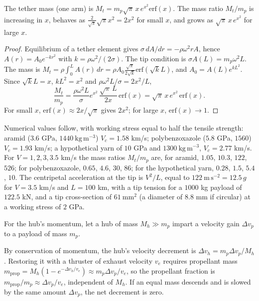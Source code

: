 \begin{proposition}
The tether mass (one arm) is $M_t=m_p\sqrt\pi\,x\,e^{x^2}\mathrm{erf}(x)$. The mass ratio $M_t/m_p$ is increasing in $x$, behaves as $\tfrac{2}{\sqrt{\pi}}\sqrt\pi x^2=2x^2$ for small $x$, and grows as $\sqrt\pi\,x\,e^{x^2}$ for large $x$.
\end{proposition}

\begin{proof}
Equilibrium of a tether element gives $\sigma\,dA/dr=-\rho\omega^2rA$, hence $A(r)=A_0e^{-kr^2}$ with $k=\rho\omega^2/(2\sigma)$. The tip condition is $\sigma A(L)=m_p\omega^2L$. The mass is $M_t=\rho\int_0^LA(r)\,dr=\rho A_0\frac{\sqrt\pi}{2\sqrt k}\mathrm{erf}(\sqrt kL)$, and $A_0=A(L)e^{kL^2}$. Since $\sqrt kL=x$, $kL^2=x^2$ and $\rho\omega^2L/\sigma=2x^2/L$,
\[
\frac{M_t}{m_p}=\frac{\rho\omega^2L}{\sigma}e^{x^2}\,\frac{\sqrt\pi\,L}{2x}\,\mathrm{erf}(x)=\sqrt\pi\,x\,e^{x^2}\,\mathrm{erf}(x).
\]
For small $x$, $\mathrm{erf}(x)\approx 2x/\sqrt\pi$ gives $2x^2$; for large $x$, $\mathrm{erf}(x)\to1$.
\end{proof}

Numerical values follow, with working stress equal to half the tensile strength: aramid ($3.6$ GPa, $1440\ \mathrm{kg\,m^{-3}}$) $V_c=1.58$ km/s; polybenzoxazole ($5.8$ GPa, $1560$) $V_c=1.93$ km/s; a hypothetical yarn of $10$ GPa and $1300\ \mathrm{kg\,m^{-3}}$, $V_c=2.77$ km/s. For $V=1,2,3,3.5$ km/s the mass ratios $M_t/m_p$ are, for aramid, $1.05$, $10.3$, $122$, $526$; for polybenzoxazole, $0.65$, $4.6$, $30$, $86$; for the hypothetical yarn, $0.28$, $1.5$, $5.4$, $10$. The centripetal acceleration at the tip is $V^2/L$, equal to $122\ \mathrm{m\,s^{-2}}=12.5\,g$ for $V=3.5$ km/s and $L=100$ km, with a tip tension for a $1000$ kg payload of $122.5$ kN, and a tip cross-section of $61\ \mathrm{mm^2}$ (a diameter of $8.8$ mm if circular) at a working stress of $2$ GPa.

For the hub's momentum, let a hub of mass $M_h\gg m_p$ impart a velocity gain $\Delta v_p$ to a payload of mass $m_p$.

\begin{proposition}
By conservation of momentum, the hub's velocity decrement is $\Delta v_h=m_p\Delta v_p/M_h$. Restoring it with a thruster of exhaust velocity $v_e$ requires propellant mass $m_{\mathrm{prop}}=M_h(1-e^{-\Delta v_h/v_e})\approx m_p\Delta v_p/v_e$, so the propellant fraction is $m_{\mathrm{prop}}/m_p\approx\Delta v_p/v_e$, independent of $M_h$. If an equal mass descends and is slowed by the same amount $\Delta v_p$, the net decrement is zero.
\end{proposition}

